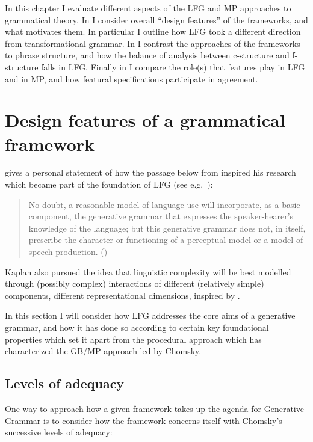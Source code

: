 \documentclass[output=paper,hidelinks]{langscibook}
\begin{document}
In this chapter I evaluate different aspects of the LFG and MP
approaches to grammatical theory. In  I
consider overall ``design features'' of the frameworks, and what
motivates them. In particular I outline how LFG took a different
direction from transformational grammar. In
 I contrast the approaches of the
frameworks to phrase structure, and how the balance of analysis
between c-structure and f-structure falls in LFG. Finally in
 I compare the role(s) that features
play in LFG and in MP, and how featural specifications participate in
agreement.

\section{Design features of a grammatical framework}
\label{sec:minimalism:2}

\citet{kaplan19} gives a personal statement of how the passage below
from \citet{chomsky1965aspects} inspired his research which became part of the
foundation of LFG (see e.g.~\citealp[173--174]{kaplanbresnan82}):

\begin{quote}
No doubt, a reasonable model of language use will incorporate, as a
basic component, the generative grammar that expresses the
speaker-hearer's knowledge of the language; but this generative
grammar does not, in itself, prescribe the character or functioning of
a perceptual model or a model of speech production.
(\citealp[9]{chomsky1965aspects}) 
\end{quote}

Kaplan also pursued the idea that linguistic complexity will be best
modelled through (possibly complex) interactions of different
(relatively simple) components, different representational dimensions,
inspired by \citet{simon62}.

In this section I will consider how LFG addresses the core aims of a
generative grammar, and how it has done so according to certain key
foundational properties which set it apart from the procedural
approach which has characterized the GB/MP approach led by Chomsky.

\subsection{Levels of adequacy}

One way to approach how a given framework takes up the agenda for
Generative Grammar is to consider how the framework concerns itself
with Chomsky's successive levels of adequacy:
\end{document}
